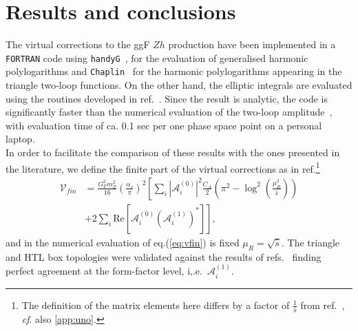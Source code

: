 \section{Results and conclusions} \label{sec:hzres}
The virtual corrections to the ggF $Zh$ production have been implemented in a  \texttt{FORTRAN} code using  \texttt{handyG}~\cite{Naterop:2019xaf}, for the evaluation of generalised harmonic polylogarithms and \texttt{Chaplin}~\cite{Buehler:2011ev} for the harmonic polylogarithms appearing in the triangle two-loop functions. 
On the other hand, the elliptic integrals are evaluated using the routines developed in
ref.~\cite{Bonciani:2018uvv}. Since the result is analytic, the code is significantly faster than the numerical evaluation of the two-loop amplitude~\cite{Chen:2020gae}, with evaluation time of ca. 0.1 sec per one phase space point on a personal laptop.\\
In order to facilitate the comparison of these results with the ones
presented in the literature, we define the finite part of the virtual corrections
as in
ref.\cite{Davies:2020drs}\footnote{The definition of the matrix elements here
	differs by a factor of
	$\frac{1}{\hat{s}}$ from ref.~\cite{Davies:2020drs}, \textit{cf}. also
	\autoref{app:uno}.}
\begin{equation}
	\begin{split}
		\mathcal{V}_{fin}&=\frac{G_F^2 m_Z^2}{16}\left(\frac{\alpha_s}{\pi}\right)^2
		\left[ \sum_{i} \left|\mathcal{A}_i^{(0)} \right|^2\frac{C_A}{2}\left(\pi^2-
		\log^2\left(\frac{\mu_R^2}{\hat{s}}\right)\right)\right. \\
		& \left. +2\sum_i\text{Re}\left[\mathcal{A}_i^{(0)}\left(\mathcal{A}_i^{(1)}\right)^*\right]\right] ,
		\label{eq:vfin}
	\end{split}
\end{equation}
and in the numerical evaluation of eq.(\ref{eq:vfin}) is fixed
$\mu_R= \sqrt{\hat{s}}$.
The triangle and HTL box topologies were validated against the results of refs.~\cite{Hasselhuhn:2016rqt,Davies:2020drs} finding perfect
agreement at the form-factor level, i,.e.~$\mathcal{A}_i^{(1)}$. \\

